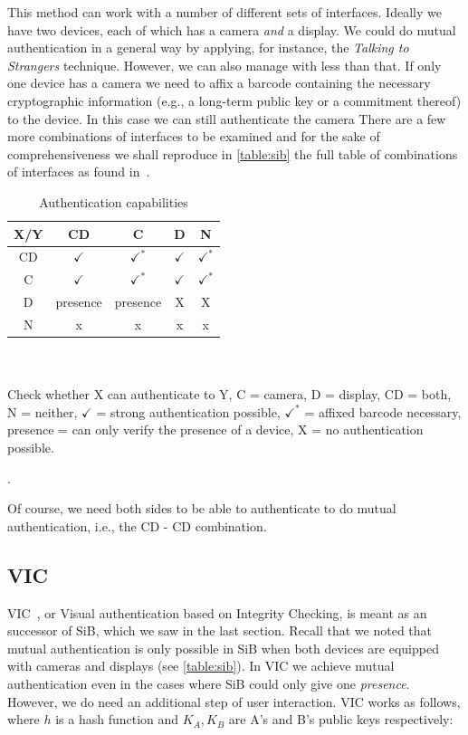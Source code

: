 \documentclass[conference, 11pt]{sty/IEEEtran}
\begin{document}
This method can work with a number of different sets of interfaces.
Ideally we have two devices, each of which has a camera \emph{and} a display.
We could do mutual authentication in a general way by applying, for instance, the \emph{Talking to Strangers} technique.
However, we can also manage with less than that.
If only one device has a camera we need to affix a barcode containing the necessary cryptographic information (e.g., a long-term public key or a commitment thereof) to the device.
In this case we can still authenticate the camera 
There are a few more combinations of interfaces to be examined and for the sake of comprehensiveness we shall reproduce in \autoref{table:sib} the full table of combinations of interfaces as found in~\cite{mccune2005seeing}.

\begin{table}[h]
    \begin{tabular}{ c | c c c c }
      X/Y  & CD & C & D & N \\ \hline
        CD & $\checkmark$ & $\checkmark^*$ & $\checkmark$ & $\checkmark^*$ \\
        C & $\checkmark$ & $\checkmark^*$ & $\checkmark$ & $\checkmark^*$ \\
        D & presence & presence & X & X \\
        N & x & x & x & x \\
    \end{tabular}
    \\ \\
    \small{Check whether X can authenticate to Y, C = camera, D = display, CD = both, N = neither, $\checkmark$ = strong authentication possible, $\checkmark^*$ = affixed barcode necessary, presence = can only verify the presence of a device, X = no authentication possible.}
    \caption{Authentication capabilities}.
    \label{table:sib}
\end{table}

Of course, we need both sides to be able to authenticate to do mutual authentication, i.e., the CD - CD combination.

\subsection{VIC}
\label{ssec:vic}

VIC~\cite{saxena2006secure}, or Visual authentication based on Integrity Checking, is meant as an successor of SiB, which we saw in the last section.
Recall that we noted that mutual authentication is only possible in SiB when both devices are equipped with cameras and displays (see \autoref{table:sib}).
In VIC we achieve mutual authentication even in the cases where SiB could only give one \emph{presence}.
However, we do need an additional step of user interaction.
VIC works as follows, where $h$ is a hash function and $K_A, K_B$ are A's and B's public keys respectively:
\end{document}

